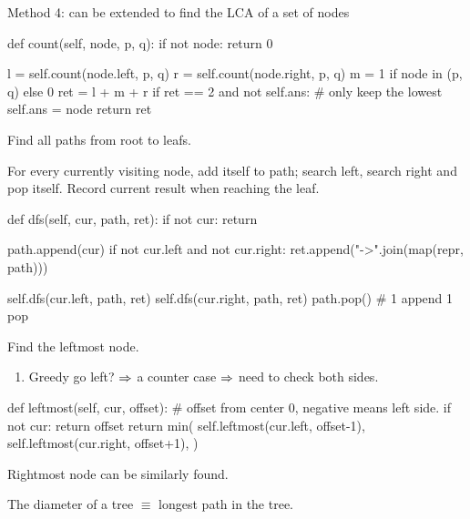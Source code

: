Method 4:  can be extended to find the LCA of a set of nodes
\begin{python}
def count(self, node, p, q):
    if not node:
        return 0

    l = self.count(node.left, p, q)
    r = self.count(node.right, p, q)
    m = 1 if node in (p, q) else 0
    ret = l + m + r
    if ret == 2 and not self.ans:
        # only keep the lowest
        self.ans = node
    return ret
\end{python}

 Find all paths from root to leafs. 

For every currently visiting node, add itself to path; search left, search right and pop itself. Record current result when reaching the leaf.
\begin{python}
def dfs(self, cur, path, ret):
    if not cur:
        return

    path.append(cur)
    if not cur.left and not cur.right:
        ret.append("->".join(map(repr, path)))

    self.dfs(cur.left, path, ret)
    self.dfs(cur.right, path, ret)
    path.pop()  # 1 append 1 pop
\end{python}

 Find the leftmost node. 
\begin{enumerate}
\item Greedy go left? $\Rightarrow$ a counter case $\Rightarrow$ need to check both sides.
\end{enumerate}
\begin{python}
def leftmost(self, cur, offset):
    # offset from center 0, negative means left side. 
    if not cur:
        return offset
    return min(
        self.leftmost(cur.left, offset-1), 
        self.leftmost(cur.right, offset+1),
    )
\end{python}

Rightmost node can be similarly found.

 The diameter of a tree $\equiv$ longest path in the tree.  


